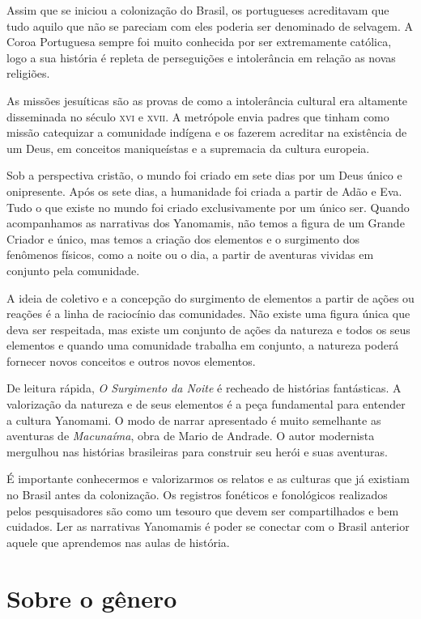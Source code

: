 Assim que se iniciou a colonização do Brasil, os portugueses acreditavam
que tudo aquilo que não se pareciam com eles poderia ser denominado de
selvagem. A Coroa Portuguesa sempre foi muito conhecida por ser
extremamente católica, logo a sua história é repleta de perseguições e
intolerância em relação as novas religiões.

As missões jesuíticas são as provas de como a intolerância cultural era
altamente disseminada no século \textsc{xvi} e \textsc{xvii}. A metrópole envia padres que
tinham como missão catequizar a comunidade indígena e os fazerem
acreditar na existência de um Deus, em conceitos maniqueístas e a
supremacia da cultura europeia.

Sob a perspectiva cristão, o mundo foi criado em sete dias por um Deus
único e onipresente. Após os sete dias, a humanidade foi criada a partir
de Adão e Eva. Tudo o que existe no mundo foi criado exclusivamente por
um único ser. Quando acompanhamos as narrativas dos Yanomamis, não temos
a figura de um Grande Criador e único, mas temos a criação dos elementos
e o surgimento dos fenômenos físicos, como a noite ou o dia, a partir de
aventuras vividas em conjunto pela comunidade.

A ideia de coletivo e a concepção do surgimento de elementos a partir de
ações ou reações é a linha de raciocínio das comunidades. Não existe uma
figura única que deva ser respeitada, mas existe um conjunto de ações da
natureza e todos os seus elementos e quando uma comunidade trabalha em
conjunto, a natureza poderá fornecer novos conceitos e outros novos
elementos.

De leitura rápida, \emph{O Surgimento da Noite} é recheado de
histórias fantásticas. A valorização da natureza e de seus elementos é a
peça fundamental para entender a cultura Yanomami. O modo de narrar
apresentado é muito semelhante as aventuras de \textit{Macunaíma}, obra de Mario
de Andrade. O autor modernista mergulhou nas histórias brasileiras para
construir seu herói e suas aventuras.

É importante conhecermos e valorizarmos os relatos e as culturas que já
existiam no Brasil antes da colonização. Os registros fonéticos e
fonológicos realizados pelos pesquisadores são como um tesouro que devem
ser compartilhados e bem cuidados. Ler as narrativas Yanomamis é poder
se conectar com o Brasil anterior aquele que aprendemos nas aulas de
história.

\section{Sobre o gênero}

